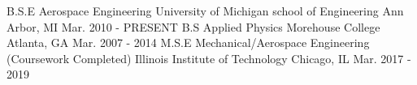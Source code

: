\begin{cventries}
\cventry
{B.S.E Aerospace Engineering} %
{University of Michigan school of Engineering} %
{Ann Arbor, MI} %
{Mar. 2010 - PRESENT} %
{ }
\vspace{-3mm}
\cventry
{B.S Applied Physics} %
{Morehouse College}  %
{Atlanta, GA} %
{Mar. 2007 - 2014} %
{ }
\vspace{-3mm}
\cventry
{M.S.E Mechanical/Aerospace Engineering (Coursework Completed)} %
{Illinois Institute of Technology}  %
{Chicago, IL} %
{Mar. 2017 - 2019} %
{ }
\vspace{-3mm}
\end{cventries}